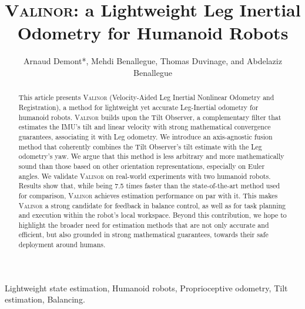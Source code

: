 \documentclass{IJCAS}
\begin{document}




\title{{\scshape Valinor}: a Lightweight Leg Inertial Odometry for Humanoid Robots}

\author{Arnaud Demont*, Mehdi Benallegue, Thomas Duvinage, and Abdelaziz Benallegue}


\begin{abstract}
This article presents {\scshape Valinor} (Velocity-Aided Leg Inertial Nonlinear Odometry and Registration), a method for lightweight yet accurate Leg-Inertial odometry for humanoid robots. {\scshape Valinor} builds upon the Tilt Observer, a complementary filter that estimates the IMU's tilt and linear velocity with strong mathematical convergence guarantees, associating it with Leg odometry. We introduce an axis-agnostic fusion method that coherently combines the Tilt Observer's tilt estimate with the Leg odometry's yaw. We argue that this method is less arbitrary and more mathematically sound than those based on other orientation representations, especially on Euler angles.
We validate {\scshape Valinor} on real-world experiments with two humanoid robots. Results show that, while being 7.5 times faster than the state-of-the-art method used for comparison, {\scshape Valinor} achieves estimation performance on par with it. This makes {\scshape Valinor} a strong candidate for feedback in balance control, as well as for task planning and execution within the robot's local workspace. 
Beyond this contribution, we hope to highlight the broader need for estimation methods that are not only accurate and efficient, but also grounded in strong mathematical guarantees, towards their safe deployment around humans.
\end{abstract}

\begin{keywords}
  Lightweight state estimation, Humanoid robots, Proprioceptive odometry, Tilt estimation, Balancing.
\end{keywords}

\maketitle
\end{document}
